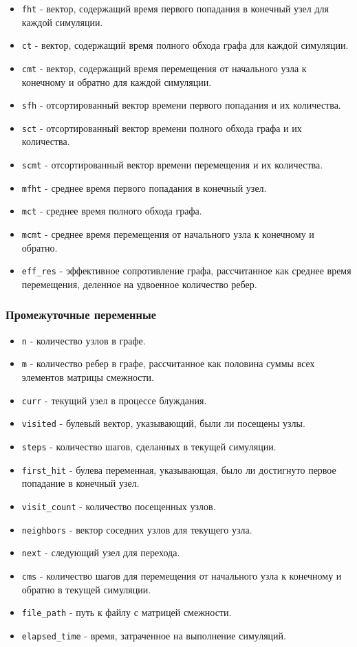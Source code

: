 \documentclass{article}
\begin{document}
\begin{itemize}
    \item \texttt{fht} - вектор, содержащий время первого попадания в конечный узел для каждой симуляции.
    \item \texttt{ct} - вектор, содержащий время полного обхода графа для каждой симуляции.
    \item \texttt{cmt} - вектор, содержащий время перемещения от начального узла к конечному и обратно для каждой симуляции.
    \item \texttt{sfh} - отсортированный вектор времени первого попадания и их количества.
    \item \texttt{sct} - отсортированный вектор времени полного обхода графа и их количества.
    \item \texttt{scmt} - отсортированный вектор времени перемещения и их количества.
    \item \texttt{mfht} - среднее время первого попадания в конечный узел.
    \item \texttt{mct} - среднее время полного обхода графа.
    \item \texttt{mcmt} - среднее время перемещения от начального узла к конечному и обратно.
    \item \texttt{eff_res} - эффективное сопротивление графа, рассчитанное как среднее время перемещения, деленное на удвоенное количество ребер.
\end{itemize}

\subsubsection{Промежуточные переменные}

\begin{itemize}
    \item \texttt{n} - количество узлов в графе.
    \item \texttt{m} - количество ребер в графе, рассчитанное как половина суммы всех элементов матрицы смежности.
    \item \texttt{curr} - текущий узел в процессе блуждания.
    \item \texttt{visited} - булевый вектор, указывающий, были ли посещены узлы.
    \item \texttt{steps} - количество шагов, сделанных в текущей симуляции.
    \item \texttt{first_hit} - булева переменная, указывающая, было ли достигнуто первое попадание в конечный узел.
    \item \texttt{visit_count} - количество посещенных узлов.
    \item \texttt{neighbors} - вектор соседних узлов для текущего узла.
    \item \texttt{next} - следующий узел для перехода.
    \item \texttt{cms} - количество шагов для перемещения от начального узла к конечному и обратно в текущей симуляции.
    \item \texttt{file_path} - путь к файлу с матрицей смежности.
    \item \texttt{elapsed_time} - время, затраченное на выполнение симуляций.
\end{itemize}
\end{document}
